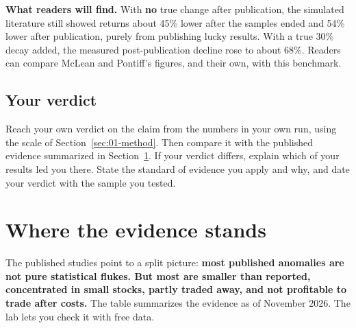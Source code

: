 \textbf{What readers will find.} With \textbf{no} true change after publication, the simulated literature still showed returns about 45\% lower after the samples ended and 54\% lower after publication, purely from publishing lucky results. With a true 30\% decay added, the measured post-publication decline rose to about 68\%. Readers can compare McLean and Pontiff's figures, and their own, with this benchmark.

\subsection*{Your verdict}

Reach your own verdict on the claim from the numbers in your own run, using the scale of Section~\ref{sec:01-method}. Then compare it with the published evidence summarized in Section~\ref{sec:19-verdict}. If your verdict differs, explain which of your results led you there. State the standard of evidence you apply and why, and date your verdict with the sample you tested.

\section{Where the evidence stands}
\label{sec:19-verdict}

The published studies point to a split picture: \textbf{most published anomalies are not pure statistical flukes. But most are smaller than reported, concentrated in small stocks, partly traded away, and not profitable to trade after costs.} The table summarizes the evidence as of November 2026. The lab lets you check it with free data.

